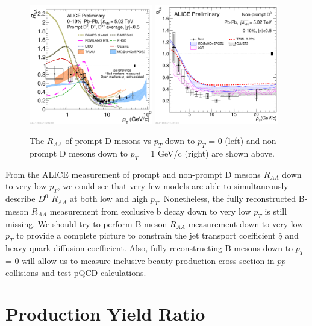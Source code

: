\begin{figure}[hbtp]
\begin{center}
\includegraphics[width=0.48\textwidth]{Figures/Chapter2/ALICEDRAALow.pdf}
\includegraphics[width=0.48\textwidth]{Figures/Chapter2/ALICENPDRAALow.pdf}
\caption{The $R_{AA}$ of prompt D mesons vs $p_T$ down to $p_T$ = 0 (left) and non-prompt D mesons down to $p_T$ = 1 GeV/c (right) are shown above.}
\label{ALICEDRAALow}
\end{center}
\end{figure}   

From the ALICE measurement of prompt and non-prompt D mesons $R_{AA}$ down to very low $p_T$, we could see that very few models are able to simultaneously describe $D^0$ $R_{AA}$ at both low and high $p_T$. Nonetheless, the fully reconstructed B-meson $R_{AA}$ measurement from exclusive b decay down to very low $p_T$ is still missing. We should try to perform B-meson $R_{AA}$ measurement down to very low $p_T$ to provide a complete picture to constrain the jet transport coefficient $\hat q$ and heavy-quark diffusion coefficient. Also, fully reconstructing B mesons down to $p_T$ = 0 will allow us to measure inclusive beauty production cross section in $pp$ collisions and test pQCD calculations.  


\section{Production Yield Ratio}

